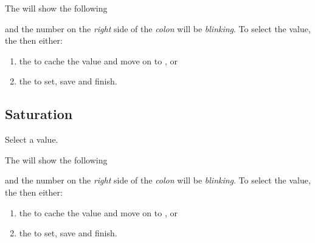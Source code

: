 The  will show the following

\begin{figure}[H]
\centering
\end{figure}

and the number on the \textit{right} side of the \textit{colon} will be
\textit{blinking}.  To select the  value,  the  then
either:

\begin{enumerate}
  \item {} the  to cache the value and move on to , or
  \item {} the  to set, save and finish.
\end{enumerate}


\subsection{Saturation} 

Select a  value.

\par\medskip

The  will show the following

\begin{figure}[H]
\centering
\end{figure}

and the number on the \textit{right} side of the \textit{colon} will be
\textit{blinking}.  To select the  value,  the  then
either:

\begin{enumerate}
  \item {} the  to cache the value and move on to , or
  \item {} the  to set, save and finish.
\end{enumerate}

